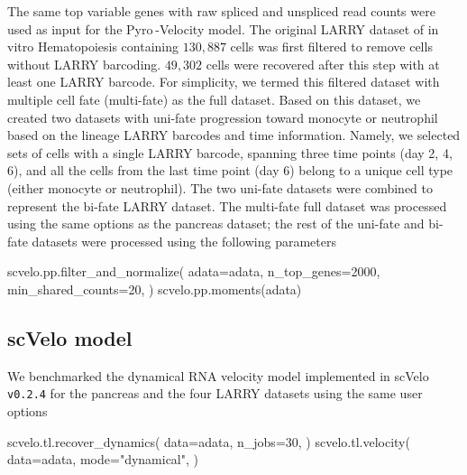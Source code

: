 \documentclass[
  sn-mathphys-num,
  lineno,
  twocolumn]{sn-jnl}
\newenvironment{Shaded}{\begin{snugshade}}{\end{snugshade}}
\newcommand{\DecValTok}[1]{\textcolor[rgb]{0.68,0.00,0.00}{#1}}
\newcommand{\NormalTok}[1]{\textcolor[rgb]{0.00,0.23,0.31}{#1}}
\newcommand{\OperatorTok}[1]{\textcolor[rgb]{0.37,0.37,0.37}{#1}}
\newcommand{\StringTok}[1]{\textcolor[rgb]{0.13,0.47,0.30}{#1}}
\begin{document}
The same top variable genes with raw spliced and unspliced read counts
were used as input for the Pyro -Velocity model. The original LARRY
dataset of in vitro Hematopoiesis containing \(130,887\) cells was first
filtered to remove cells without LARRY barcoding. \(49,302\) cells were
recovered after this step with at least one LARRY barcode. For
simplicity, we termed this filtered dataset with multiple cell fate
(multi-fate) as the full dataset. Based on this dataset, we created two
datasets with uni-fate progression toward monocyte or neutrophil based
on the lineage LARRY barcodes and time information. Namely, we selected
sets of cells with a single LARRY barcode, spanning three time points
(day 2, 4, 6), and all the cells from the last time point (day 6) belong
to a unique cell type (either monocyte or neutrophil). The two uni-fate
datasets were combined to represent the bi-fate LARRY dataset. The
multi-fate full dataset was processed using the same options as the
pancreas dataset; the rest of the uni-fate and bi-fate datasets were
processed using the following parameters

\begin{Shaded}
\begin{Highlighting}[]
\NormalTok{scvelo.pp.filter\_and\_normalize(}
\NormalTok{  adata}\OperatorTok{=}\NormalTok{adata,}
\NormalTok{  n\_top\_genes}\OperatorTok{=}\DecValTok{2000}\NormalTok{,}
\NormalTok{  min\_shared\_counts}\OperatorTok{=}\DecValTok{20}\NormalTok{,}
\NormalTok{)}
\NormalTok{scvelo.pp.moments(adata)}
\end{Highlighting}
\end{Shaded}

\subsection{scVelo model}\label{sec-methods-scvelo}

We benchmarked the dynamical RNA velocity model implemented in scVelo
\texttt{v0.2.4} for the pancreas and the four LARRY datasets using the
same user options

\begin{Shaded}
\begin{Highlighting}[]
\NormalTok{scvelo.tl.recover\_dynamics(}
\NormalTok{  data}\OperatorTok{=}\NormalTok{adata, }
\NormalTok{  n\_jobs}\OperatorTok{=}\DecValTok{30}\NormalTok{,}
\NormalTok{)}
\NormalTok{scvelo.tl.velocity(}
\NormalTok{  data}\OperatorTok{=}\NormalTok{adata, }
\NormalTok{  mode}\OperatorTok{=}\StringTok{"dynamical"}\NormalTok{,}
\NormalTok{)}
\end{Highlighting}
\end{Shaded}
\end{document}
